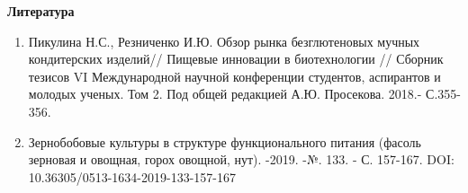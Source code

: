 \begin{center}
{\bfseries Литература}
\end{center}

\begin{references}
\begin{enumerate}
\def\labelenumi{\arabic{enumi}.}
\item
  Пикулина Н.С., Резниченко И.Ю. Обзор рынка безглютеновых мучных
  кондитерских изделий// Пищевые инновации в биотехнологии // Сборник
  тезисов VI Международной научной конференции студентов, аспирантов и
  молодых ученых. Том 2. Под общей редакцией А.Ю. Просекова. 2018.-
  С.355-356.
\item
  Зернобобовые культуры в структуре функционального питания (фасоль
  зерновая и овощная, горох овощной, нут). -2019. -№. 133. - С. 157-167. DOI: 10.36305/0513-1634-2019-133-157-167
\end{enumerate}



\end{references}

